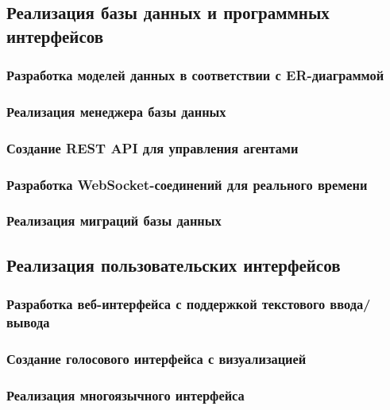 \documentclass{syksu-coursework}
\begin{document}
\subsection{Реализация базы данных и программных интерфейсов}

\subsubsection{Разработка моделей данных в соответствии с ER-диаграммой}

\subsubsection{Реализация менеджера базы данных}

\subsubsection{Создание REST API для управления агентами}

\subsubsection{Разработка WebSocket-соединений для реального времени}

\subsubsection{Реализация миграций базы данных}

\subsection{Реализация пользовательских интерфейсов}

\subsubsection{Разработка веб-интерфейса с поддержкой текстового ввода/вывода}

\subsubsection{Создание голосового интерфейса с визуализацией}

\subsubsection{Реализация многоязычного интерфейса}
\end{document}
